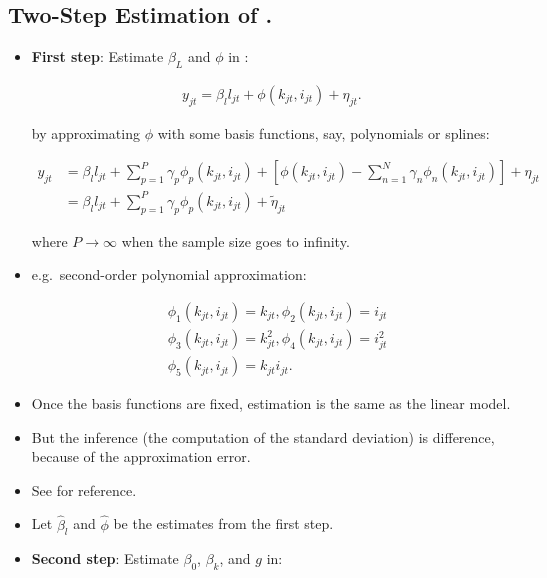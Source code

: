 \documentclass[]{book}
\providecommand{\tightlist}{%
  \setlength{\itemsep}{0pt}\setlength{\parskip}{0pt}}
\theoremstyle{definition}
\theoremstyle{definition}
\theoremstyle{definition}
\theoremstyle{remark}
\begin{document}
\subsection{\texorpdfstring{Two-Step Estimation of
\citet{Olley1996}.}{Two-Step Estimation of @Olley1996.}}\label{two-step-estimation-of-olley1996.}

\begin{itemize}
\tightlist
\item
  \textbf{First step}: Estimate \(\beta_L\) and \(\phi\) in :

  \begin{equation}
  \begin{split}
  y_{jt} = \beta_l l_{jt} + \phi(k_{jt}, i_{jt}) + \eta_{jt}.
  \end{split}
  \end{equation}

  by approximating \(\phi\) with some basis functions, say, polynomials
  or splines:

  \begin{equation}
  \begin{split}
  y_{jt} &= \beta_l l_{jt} +  \sum_{p = 1}^P \gamma_p \phi_p(k_{jt}, i_{jt}) +  \left[\phi(k_{jt}, i_{jt}) - \sum_{n = 1}^N \gamma_n \phi_n(k_{jt}, i_{jt})\right] + \eta_{jt}\\
  & = \beta_l l_{jt} +  \sum_{p = 1}^P \gamma_p \phi_p(k_{jt}, i_{jt}) + \tilde{\eta}_{jt}
  \end{split}
  \end{equation}

  where \(P \to \infty\) when the sample size goes to infinity.
\item
  e.g.~second-order polynomial approximation:

  \begin{equation}
  \begin{split}
  & \phi_1(k_{jt}, i_{jt}) = k_{jt}, \phi_2(k_{jt}, i_{jt}) = i_{jt}\\
  & \phi_3(k_{jt}, i_{jt}) = k_{jt}^2, \phi_4(k_{jt}, i_{jt}) = i_{jt}^2\\
  & \phi_5(k_{jt}, i_{jt}) = k_{jt} i_{jt}.
  \end{split}
  \end{equation}
\item
  Once the basis functions are fixed, estimation is the same as the
  linear model.
\item
  But the inference (the computation of the standard deviation) is
  difference, because of the approximation error.
\item
  See \citet{Chen2007} for reference.
\item
  Let \(\hat{\beta}_l\) and \(\hat{\phi}\) be the estimates from the
  first step.
\item
  \textbf{Second step}: Estimate \(\beta_0\), \(\beta_k\), and \(g\) in:


\end{itemize}
\end{document}
